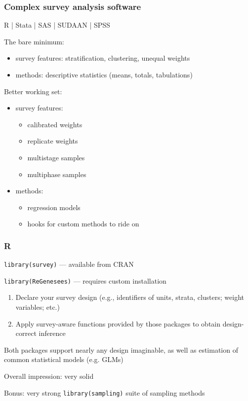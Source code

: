 \documentclass{beamer}
\begin{document}
\begin{frame}\frametitle{Complex survey analysis software}

R | Stata | SAS | SUDAAN | SPSS

\bigskip

The bare minimum:
\begin{itemize}
    \item survey features: stratification, clustering, unequal weights
    \item methods: descriptive statistics (means, totals, tabulations)
\end{itemize}

Better working set:
\begin{itemize}
    \item survey features:
    \begin{itemize}
        \item calibrated weights
        \item replicate weights
        \item multistage samples
        \item multiphase samples
    \end{itemize}
    \item methods:
    \begin{itemize}
        \item regression models
        \item hooks for custom methods to ride on
    \end{itemize}
\end{itemize}

\end{frame}


\begin{frame}\frametitle{R}

\texttt{library(survey)} --- available from CRAN \citep{lumley:2010}

\texttt{library(ReGenesees)} --- requires custom installation

\begin{enumerate}
    \item Declare your survey design (e.g., identifiers of units, strata, clusters; weight variables; etc.)
    \item Apply survey-aware functions provided by those packages to obtain design-correct inference
\end{enumerate}

Both packages support nearly any design imaginable, as well as estimation of common statistical models (e.g. GLMs)

\bigskip

Overall impression: very solid

\bigskip

Bonus: very strong \texttt{library(sampling)} suite of sampling methods \citep{tille:2006}

\end{frame}
\end{document}
